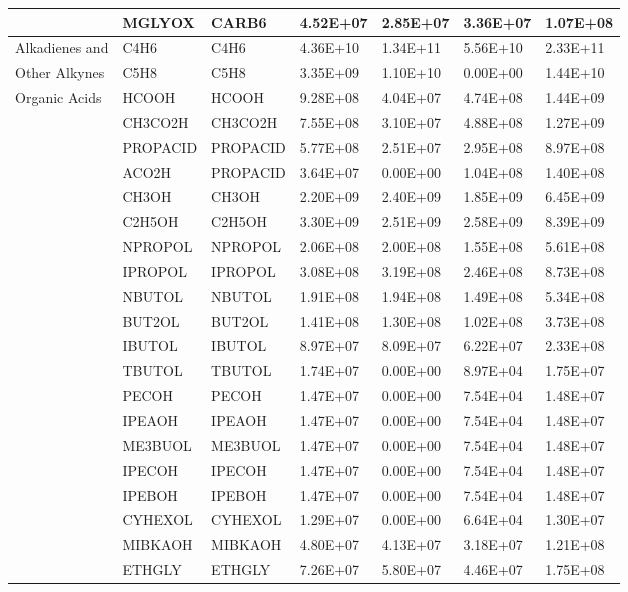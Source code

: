 \begin{longtable}{lllllll}
	 & MGLYOX & CARB6 & 4.52E+07 & 2.85E+07 & 3.36E+07 & 1.07E+08 \\
	\hline Alkadienes and & C4H6 & C4H6 & 4.36E+10 & 1.34E+11 & 5.56E+10 & 2.33E+11 \\
	Other Alkynes & C5H8 & C5H8 & 3.35E+09 & 1.10E+10 & 0.00E+00 & 1.44E+10 \\
	\hline \multirow{4}{*}{Organic Acids} & HCOOH & HCOOH & 9.28E+08 & 4.04E+07 & 4.74E+08 & 1.44E+09 \\*
	 & CH3CO2H & CH3CO2H & 7.55E+08 & 3.10E+07 & 4.88E+08 & 1.27E+09 \\*
	 & PROPACID & PROPACID & 5.77E+08 & 2.51E+07 & 2.95E+08 & 8.97E+08 \\
	 & ACO2H & PROPACID & 3.64E+07 & 0.00E+00 & 1.04E+08 & 1.40E+08 \\
	\hline \parbox[t]{2mm}{} & CH3OH & CH3OH & 2.20E+09 & 2.40E+09 & 1.85E+09 & 6.45E+09 \\
	 & C2H5OH & C2H5OH & 3.30E+09 & 2.51E+09 & 2.58E+09 & 8.39E+09 \\
	 & NPROPOL & NPROPOL & 2.06E+08 & 2.00E+08 & 1.55E+08 & 5.61E+08 \\
	 & IPROPOL & IPROPOL & 3.08E+08 & 3.19E+08 & 2.46E+08 & 8.73E+08 \\
	 & NBUTOL & NBUTOL & 1.91E+08 & 1.94E+08 & 1.49E+08 & 5.34E+08 \\
	 & BUT2OL & BUT2OL & 1.41E+08 & 1.30E+08 & 1.02E+08 & 3.73E+08 \\
	 & IBUTOL & IBUTOL & 8.97E+07 & 8.09E+07 & 6.22E+07 & 2.33E+08 \\
	 & TBUTOL & TBUTOL & 1.74E+07 & 0.00E+00 & 8.97E+04 & 1.75E+07 \\
	 & PECOH & PECOH & 1.47E+07 & 0.00E+00 & 7.54E+04 & 1.48E+07 \\
	 & IPEAOH & IPEAOH & 1.47E+07 & 0.00E+00 & 7.54E+04 & 1.48E+07 \\
	 & ME3BUOL & ME3BUOL & 1.47E+07 & 0.00E+00 & 7.54E+04 & 1.48E+07 \\
	 & IPECOH & IPECOH & 1.47E+07 & 0.00E+00 & 7.54E+04 & 1.48E+07 \\
	 & IPEBOH & IPEBOH & 1.47E+07 & 0.00E+00 & 7.54E+04 & 1.48E+07 \\
	 & CYHEXOL & CYHEXOL & 1.29E+07 & 0.00E+00 & 6.64E+04 & 1.30E+07 \\
	 & MIBKAOH & MIBKAOH & 4.80E+07 & 4.13E+07 & 3.18E+07 & 1.21E+08 \\
	 & ETHGLY & ETHGLY & 7.26E+07 & 5.80E+07 & 4.46E+07 & 1.75E+08 \\

\end{longtable}
